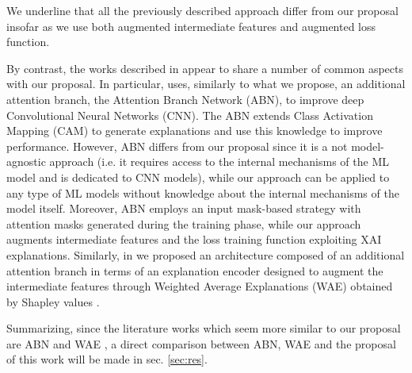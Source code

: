 We underline that all the previously described approach differ from our proposal insofar as we use both augmented intermediate features and augmented loss function.

By contrast, the works described in \cite{fukui2019attention,apicella2023shap} appear to share a number of common aspects with our proposal.
In particular, \cite{fukui2019attention} uses, similarly to what we propose, an additional attention branch, the Attention Branch Network (ABN), to improve deep Convolutional Neural Networks (CNN). The ABN extends Class Activation Mapping (CAM) \citep{zhou2016learning} to generate explanations and use this knowledge to improve performance. However, ABN differs from our proposal since it is a not model-agnostic approach (i.e. it requires access to the internal mechanisms of the ML model and is dedicated to CNN models), while our approach can be applied to any type of ML models without knowledge about the internal mechanisms of the model itself. Moreover, ABN employs an input mask-based strategy with attention masks generated during the training phase, while our approach augments intermediate features and the loss training function exploiting XAI explanations. %
Similarly, in \cite{apicella2023shap} we proposed an architecture composed of an additional attention branch in terms of an explanation encoder designed to augment the intermediate features through Weighted Average Explanations (WAE) obtained by Shapley values \citep{NIPS2017_7062}.

Summarizing, since the literature works which seem more similar to our proposal are ABN \citep{fukui2019attention} and WAE \citep{apicella2023shap}, a direct comparison between ABN, WAE and the proposal of this work will be made in sec. \ref{sec:res}.

%
